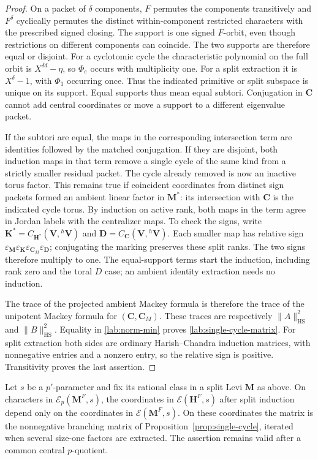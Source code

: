 \begin{proof}
On a packet of $\delta$ components, $F$ permutes the
components transitively and $F^\delta$ cyclically permutes
the distinct within-component restricted characters with
the prescribed signed closing.  The support is one signed
$F$-orbit, even though restrictions on different components
can coincide.  The two supports are therefore equal or
disjoint.  For a cyclotomic cycle the characteristic
polynomial on the full orbit is $X^{\delta d}-\eta$,
so $\Phi_e$ occurs with multiplicity one.  For a split
extraction it is $X^\delta-1$, with $\Phi_1$ occurring
once.  Thus the indicated primitive or split subspace
is unique on its support.  Equal supports thus
mean equal subtori.  Conjugation in $\mathbf C$ cannot add
central coordinates or move a support to a different
eigenvalue packet.

If the subtori are equal, the maps in the corresponding
intersection term are identities followed by the matched
conjugation.  If they are disjoint, both induction maps in
that term remove a single cycle of the same kind from a
strictly smaller residual packet.  The cycle already removed
is now an inactive torus factor.  This remains true if
coincident coordinates from distinct sign packets formed
an ambient linear factor in $\mathbf M^*$: its intersection
with $\mathbf C$ is the indicated cycle torus.  By induction
on active rank, both maps in the term agree in Jordan labels
with the centralizer maps.  To check the signs, write
$\mathbf K^*=C_{\mathbf H^*}(\mathbf V,{}^h\mathbf V)$
and $\mathbf D=C_{\mathbf C}(\mathbf V,{}^h\mathbf V)$.
Each smaller map has relative sign
$\varepsilon_{\mathbf M}\varepsilon_{\mathbf K}
 \varepsilon_{\mathbf C_M}\varepsilon_{\mathbf D}$;
conjugating the marking preserves these split ranks.
The two signs therefore multiply to one.  The equal-support terms start
the induction, including rank zero and the toral $D$ case;
an ambient identity extraction needs no induction.

The trace of the projected ambient Mackey formula is
therefore the trace of the unipotent Mackey formula for
$(\mathbf C,\mathbf C_M)$.  These traces are respectively
$\|A\|_{\mathrm{HS}}^2$ and $\|B\|_{\mathrm{HS}}^2$.
Equality in \eqref{lab:norm-min} proves
\eqref{lab:single-cycle-matrix}.  For split extraction both
sides are ordinary Harish--Chandra induction matrices, with
nonnegative entries and a nonzero entry, so the relative sign
is positive.  Transitivity proves the last assertion.
\end{proof}

\begin{corollary}\label{lab:projected-hc}
Let $s$ be a $p'$-parameter and fix its rational class in a
split Levi $\mathbf M$ as above.  On characters in
$\mathcal E_p(\mathbf M^F,s)$, the coordinates in
$\mathcal E(\mathbf H^F,s)$ after split induction depend only
on the coordinates in $\mathcal E(\mathbf M^F,s)$.
On these coordinates the matrix is the nonnegative branching
matrix of Proposition~\ref{prop:single-cycle}, iterated when
several size-one factors are extracted.  The assertion remains
valid after a common central $p$-quotient.
\end{corollary}

